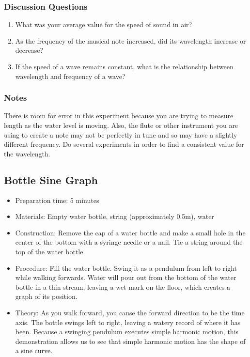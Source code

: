 \subsubsection*{Discussion Questions}
\begin{enumerate}
\item{What was your average value for the speed of sound in air?}
\item{As the frequency of the musical note increased, did its wavelength increase or decrease?}
\item{If the speed of a wave remains constant, what is the relationship between wavelength and frequency of a wave?}
\end{enumerate}

\subsubsection*{Notes}
There is room for error in this experiment because you are trying to measure length as the water level is moving. Also, the flute or other instrument you are using to create a note may not be perfectly in tune and so may have a slightly different frequency. Do several experiments in order to find a consistent value for the wavelength.



\subsection{Bottle Sine Graph}
\begin{itemize}
\item{Preparation time: 5 minutes}
\item{Materials: Empty water bottle, string (approximately 0.5m), water}
\item{Construction: Remove the cap of a water bottle and make a small hole in the center of the bottom with a syringe needle or a nail. Tie a string around the top of the water bottle.}
\item{Procedure: Fill the water bottle. Swing it as a pendulum from left to right while walking forwards. Water will pour out from the bottom of the water bottle in a thin stream, leaving a wet mark on the floor, which creates a graph of its position.}
\item{Theory: As you walk forward, you cause the forward direction to be the time axis. The bottle swings left to right, leaving a watery record of where it has been. Because a swinging pendulum executes simple harmonic motion, this demonstration allows us to see that simple harmonic motion has the shape of a sine curve.}
\end{itemize}


